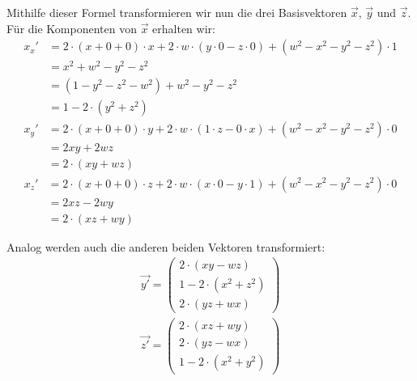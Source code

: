 Mithilfe dieser Formel transformieren wir nun die drei Basisvektoren $\vec x$, $\vec y$ und $\vec z$. Für die Komponenten von $\vec x$ erhalten wir:
\begin{equation}
\begin{split}
 x_x' &= 2 \cdot ( x + 0 + 0 ) \cdot x + 2 \cdot w \cdot ( y \cdot 0 - z \cdot 0 ) + ( w^2 - x^2 - y^2 - z^2 ) \cdot 1 \\
      &= x^2 + w^2 - y^2 - z^2 \\
      &= ( 1 - y^2 - z^2 - w^2 ) + w^2 - y^2 - z^2 \\
      &= 1 - 2 \cdot ( y^2 + z^2 )
\end{split}
\end{equation}
\begin{equation}
\begin{split}
 x_y' &= 2 \cdot ( x + 0 + 0 ) \cdot y + 2 \cdot w \cdot ( 1 \cdot z - 0 \cdot x ) + ( w^2 - x^2 - y^2 - z^2 ) \cdot 0 \\
      &= 2xy + 2wz \\
      &= 2 \cdot ( xy + wz )
\end{split}
\end{equation}
\begin{equation}
\begin{split}
 x_z' &= 2 \cdot ( x + 0 + 0 ) \cdot z + 2 \cdot w \cdot ( x \cdot 0 - y \cdot 1 ) + ( w^2 - x^2 - y^2 - z^2 ) \cdot 0 \\
      &= 2xz - 2wy \\
      &= 2 \cdot ( xz + wy )
\end{split}
\end{equation}

Analog werden auch die anderen beiden Vektoren transformiert:
\begin{align}
 \vec{y'} =
 \begin{pmatrix}
  2 \cdot ( xy - wz ) \\
  1 - 2 \cdot ( x^2 + z^2 ) \\
  2 \cdot ( yz + wx )
 \end{pmatrix} \\
 \vec{z'} = 
 \begin{pmatrix}
  2 \cdot ( xz + wy ) \\
  2 \cdot ( yz - wx ) \\
  1 - 2 \cdot ( x^2 + y^2 )
 \end{pmatrix}
\end{align}

